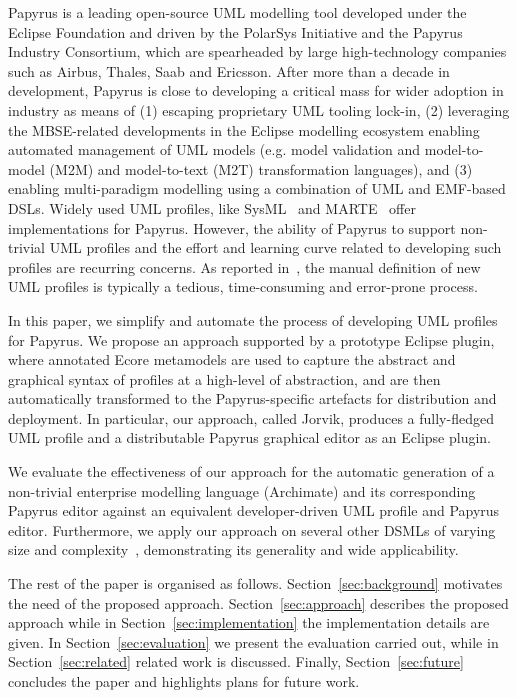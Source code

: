 Papyrus \cite{lanusse2009papyrus} is a leading open-source UML modelling tool developed under the Eclipse Foundation and driven by the PolarSys Initiative and the Papyrus Industry Consortium, which are spearheaded by large high-technology companies such as Airbus, Thales, Saab and Ericsson. 
After more than a decade in development, Papyrus is close to developing a critical mass for wider adoption in industry as means of (1) escaping proprietary UML tooling lock-in, (2) leveraging the MBSE-related developments in the Eclipse modelling ecosystem enabling automated management of UML models (e.g. model validation and model-to-model (M2M) and model-to-text (M2T) transformation languages), and (3) enabling multi-paradigm modelling using a combination of UML and EMF-based DSLs. 
Widely used UML profiles, like SysML~\cite{friedenthal2014practical} and MARTE~\cite{omg2011marte} offer implementations for Papyrus. 
However, the ability of Papyrus to support non-trivial UML profiles and the effort and learning curve related to developing such profiles are recurring concerns. 
As reported in~\cite{Wimmer2009:IJWIS}, the manual definition of new UML profiles is typically a tedious, time-consuming and error-prone process.

In this paper, we simplify and automate the process of developing UML profiles for Papyrus. 
We propose an approach supported by a prototype Eclipse plugin, where annotated Ecore metamodels are used to capture the abstract and graphical syntax of profiles at a high-level of abstraction, and are then automatically transformed to the Papyrus-specific artefacts for distribution and deployment. 
In particular, our approach, called Jorvik, produces a fully-fledged UML profile and a distributable Papyrus graphical editor as an Eclipse plugin. 

We evaluate the effectiveness of our approach for the automatic generation of a non-trivial enterprise modelling language (Archimate) and its corresponding Papyrus editor against an equivalent developer-driven UML profile and Papyrus editor. 
Furthermore, we apply our approach on several other DSMLs of varying size and complexity~\cite{williams2013metamodels}, demonstrating its generality and wide applicability.

The rest of the paper is organised as follows. 
Section~\ref{sec:background} motivates the need of the proposed approach. 
Section~\ref{sec:approach} describes the proposed approach while in Section~\ref{sec:implementation} the implementation details are given. 
In Section~\ref{sec:evaluation} we present the evaluation carried out, while in Section~\ref{sec:related} related work is discussed. 
Finally, Section~\ref{sec:future} concludes the paper and highlights plans for future work.